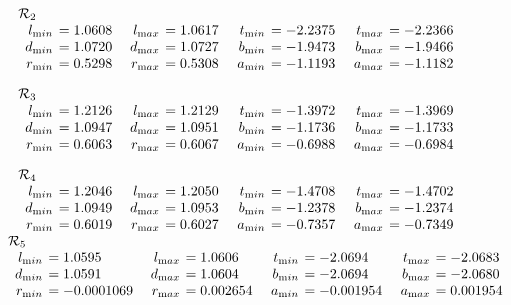 \begin{table}
\begin{small}
$$\begin{array}{rlrlrlrl}\noalign{\noindent  ${\mathcal R}_2$}
\noalign{\vskip2pt}
l_{\textrm min} &\hskip-6pt =  1.0608&\enspace    l_{\textrm max} &\hskip-6pt = 1.0617&\enspace   
t_{\textrm min} &\hskip-6pt =  -2.2375&\enspace    t_{\textrm max} &\hskip-6pt = -2.2366\\
d_{\textrm min} &\hskip-6pt =  1.0720&  d_{\mathrm
max}&\hskip-6pt  = 1.0727&   b_{\textrm min} &\hskip-6pt =  -1.9473&  b_{\textrm max} &\hskip-6pt = -1.9466\\
r_{\textrm min} &\hskip-6pt =  0.5298& 
r_{\textrm max} &\hskip-6pt = 0.5308&   a_{\textrm min} &\hskip-6pt =  -1.1193&  a_{\textrm max} &\hskip-6pt = -1.1182\end{array}$$

$$\begin{array}{rlrlrlrl}
\noalign{\noindent  ${\mathcal R}_3$}
\noalign{\vskip2pt}
l_{\textrm min} &\hskip-6pt =  1.2126&\enspace    l_{\textrm max} &\hskip-6pt = 1.2129&\enspace   
t_{\textrm min} &\hskip-6pt =  -1.3972&\enspace    t_{\textrm max}&\hskip-6pt  = -1.3969\\
d_{\textrm min} &\hskip-6pt =  1.0947&  d_{\mathrm
max}&\hskip-6pt  = 1.0951&   b_{\textrm min} &\hskip-6pt =  -1.1736&  b_{\textrm max}&\hskip-6pt  = -1.1733\\
r_{\textrm min} &\hskip-6pt =  0.6063& 
r_{\textrm max}&\hskip-6pt  = 0.6067&   a_{\textrm min} &\hskip-6pt =  -0.6988&  a_{\textrm max}&\hskip-6pt  = -0.6984\end{array}
$$

$$\begin{array}{rlrlrlrl}
\noalign{\noindent  ${\mathcal R}_4$}
\noalign{\vskip2pt}
l_{\textrm min} &\hskip-6pt =  1.2046&\enspace    l_{\textrm max}&\hskip-6pt  = 1.2050&\enspace   
t_{\textrm min} &\hskip-6pt =  -1.4708&\enspace    t_{\textrm max}&\hskip-6pt = -1.4702\\
d_{\textrm min} &\hskip-6pt =  1.0949&  d_{\mathrm
max}&\hskip-6pt  = 1.0953&   b_{\textrm min} &\hskip-6pt =  -1.2378&  b_{\textrm max} &\hskip-6pt = -1.2374\\
r_{\textrm min} &\hskip-6pt =  0.6019& 
r_{\textrm max} &\hskip-6pt = 0.6027&   a_{\textrm min} &\hskip-6pt =  -0.7357&  a_{\textrm max} &\hskip-6pt = -0.7349\end{array}$$

$$\begin{array}{rlrlrlrl}
\noalign{\vskip-10pt}
\noalign{\noindent  ${\mathcal R}_5$}
\noalign{\vskip2pt}
l_{\textrm min} &\hskip-6pt =  1.0595&\enspace    l_{\textrm max}&\hskip-6pt = 1.0606&\enspace   
t_{\textrm min}&\hskip-6pt =  -2.0694&\enspace   t_{\textrm max} &\hskip-6pt = -2.0683\\
d_{\textrm min} &\hskip-6pt =  1.0591&  d_{\mathrm
max}&\hskip-6pt  = 1.0604&   b_{\textrm min} &\hskip-6pt =  -2.0694&  b_{\textrm max}&\hskip-6pt  = -2.0680\\
r_{\textrm min} &\hskip-6pt =  -0.0001069&  r_{\textrm max} &\hskip-6pt =  0.002654&  a_{\textrm min} &\hskip-6pt =  -0.001954&  a_{\textrm max}
&\hskip-6pt =  0.001954\end{array}$$


\end{small}
\end{table}
